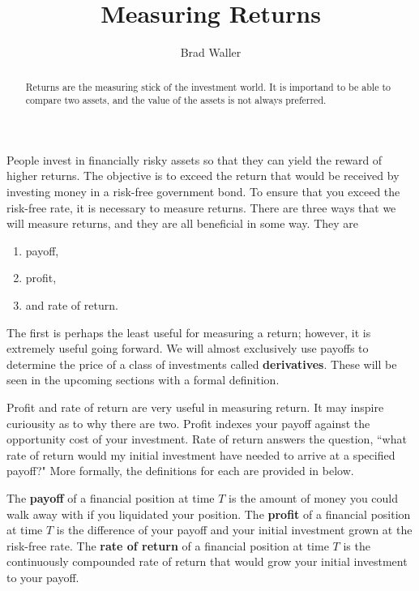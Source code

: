 \documentclass{ximera}
\author{Brad Waller}
\title{Measuring Returns}
\begin{document}
\begin{abstract}
Returns are the measuring stick of the investment world. It is importand to be able to compare two assets, and the value of the assets is not always preferred.
\end{abstract}

\maketitle

People invest in financially risky assets so that they can yield the reward of higher returns. The objective is to exceed the return that would be received by investing money in a risk-free government bond. To ensure that you exceed the risk-free rate, it is necessary to measure returns. There are three ways that we will measure returns, and they are all beneficial in some way. They are

\begin{enumerate}
\item payoff,
\item profit,
\item and rate of return. 
\end{enumerate}

The first is perhaps the least useful for measuring a return; however, it is extremely useful going forward. We will almost exclusively use payoffs to determine the price of a class of investments called {\bf derivatives}. These will be seen in the upcoming sections with a formal definition.

Profit and rate of return are very useful in measuring return. It may inspire curiousity as to why there are two. Profit indexes your payoff against the opportunity cost of your investment. Rate of return answers the question, ``what rate of return would my initial investment have needed to arrive at a specified payoff?" More formally, the definitions for each are provided in below.

\begin{definition}\label{def9}
The {\bf payoff} of a financial position at time $T$ is the amount of money you could walk away with if you liquidated your position. The {\bf profit} of a financial position at time $T$ is the difference of your payoff and your initial investment grown at the risk-free rate. The {\bf rate of return} of a financial position at time $T$ is the continuously compounded rate of return that would grow your initial investment to your payoff. 
\end{definition}
\end{document}
